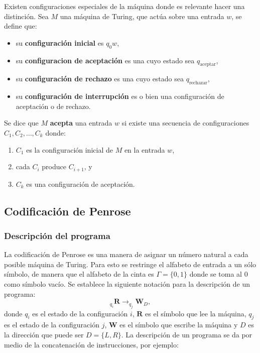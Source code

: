 \documentclass[10pt,a4paper]{article}
\begin{document}
Existen configuraciones especiales de la máquina donde es relevante hacer una distinción. Sea $M$ una máquina de Turing, que actúa sobre una entrada $w$, se define que:

\begin{itemize}
	\item su \textbf{configuración inicial} es $q_0 w$,
	\item su \textbf{configuracion de aceptación} es una cuyo estado sea $q_{\text{aceptar}}$,
	\item su \textbf{configuración de rechazo} es una cuyo estado sea $q_{\text{rechazar}}$,
	\item su \textbf{configuración de interrupción} es o bien una configuración de aceptación o de rechazo.
\end{itemize}

Se dice que $M$ \textbf{acepta} una entrada $w$ si existe una secuencia de configuraciones $C_1, C_2, \dots, C_k$ donde:
\begin{enumerate}
	\item $C_1$ es la configuración inicial de $M$ en  la entrada $w$,
	\item cada $C_i$ produce $C_{i+1}$, y
	\item $C_k$ es una configuración de aceptación.
\end{enumerate}

\subsection{Codificación de Penrose}
\subsubsection{Descripción del programa}
La codificación de Penrose es una manera de asignar un número natural a cada posible máquina de Turing. Para esto se restringe el alfabeto de entrada a un sólo símbolo, de manera que el alfabeto de la cinta es $\Gamma = \{0,1\}$ donde se toma al $0$ como símbolo vacío. Se establece la siguiente notación para la descripción de un programa:
\[
	_{q_i}\textbf{R} \rightarrow _{q_j}\textbf{W}_{D},
\]
donde $q_i$ es el estado de la configuración $i$, $\textbf{R}$ es el símbolo que lee la máquina, $q_j$ es el estado de la configuración $j$, $\textbf{W}$ es el símbolo que escribe la máquina y $D$ es la dirección que puede ser $D = \{L,R\}$. La descripción de un programa se da por medio de la concatenación de instrucciones, por ejemplo:
\end{document}
